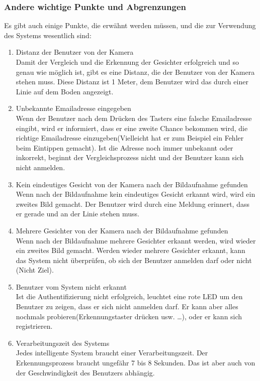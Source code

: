 \subsubsection{Andere wichtige Punkte und Abgrenzungen}

Es gibt auch einige Punkte, die erwähnt werden müssen, und die zur Verwendung des Systems wesentlich sind:

\begin{enumerate}
	\item Distanz der Benutzer von der Kamera \\
	
	Damit der Vergleich und die Erkennung der Gesichter erfolgreich und so genau wie möglich ist, gibt es eine Distanz, die der Benutzer von der Kamera stehen muss. Diese Distanz ist 1 Meter, dem Benutzer wird das durch einer Linie auf dem Boden angezeigt.
	\item Unbekannte Emailadresse eingegeben \\
	
	Wenn der Benutzer nach dem Drücken des Tasters eine falsche Emailadresse eingibt, wird er informiert, dass er eine zweite Chance bekommen wird, die richtige Emailadresse einzugeben(Vielleicht hat er zum Beispiel ein Fehler beim Eintippen gemacht). Ist die Adresse noch immer unbekannt oder inkorrekt, beginnt der Vergleichsprozess nicht und der Benutzer kann sich nicht anmelden.
	
	\item Kein eindeutiges Gesicht von der Kamera nach der Bildaufnahme gefunden \\
	
	Wenn nach der Bildaufnahme kein eindeutiges Gesicht erkannt wird, wird ein zweites Bild gemacht. Der Benutzer wird durch eine Meldung erinnert, dass er gerade und an der Linie stehen muss.
	
	\item Mehrere Gesichter von der Kamera nach der Bildaufnahme gefunden \\
	
	Wenn nach der Bildaufnahme mehrere Gesichter erkannt werden, wird wieder ein zweites Bild gemacht. Werden wieder mehrere Gesichter erkannt, kann das System nicht überprüfen, ob sich der Benutzer anmelden darf oder nicht (Nicht Ziel).
	
	\item Benutzer vom System nicht erkannt \\
	
	Ist die Authentifizierung nicht erfolgreich, leuchtet eine rote LED um den Benutzer zu zeigen, dass er sich nicht anmelden darf. Er kann aber alles nochmals probieren(Erkennungstaster drücken usw. …), oder er kann sich registrieren.
	\item Verarbeitungszeit des Systems \\
	
	Jedes intelligente System braucht einer Verarbeitungszeit. Der Erkennungsprozess braucht ungefähr 7 bis 8 Sekunden. Das ist aber auch von der Geschwindigkeit des Benutzers abhängig.
\end{enumerate}
